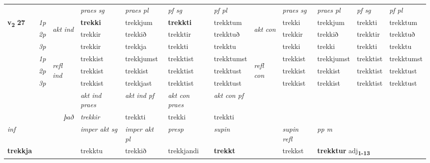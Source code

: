 \begin{longtable}[l]{X>{\footnotesize\itshape}llXXXXlXXXX}
\midrule

 & &   & \textit{praes sg}  & \textit{praes pl}    & \textit{ pf sg} & \textit{pf pl} & & \textit{praes sg}  & \textit{praes pl}    & \textit{pf sg} & \textit{pf pl }  \\ \cmidrule{4-7} \cmidrule{9-12}
 \multirow{2}{*}{{{\textbf{v{\textsubscript{2}}} \Large{\textbf{27}}}}}  & 1p & \multirow{3}{*}{\begin{turn}{90}\textit{akt ind}\end{turn}} & \textbf{trekki} & trekkjum & \textbf{trekkti} & trekktum & \multirow{3}{*}{\begin{turn}{90}\textit{akt con}\end{turn}} &trekki & trekkjum & trekkti & trekktum\\*
 & 2p &  &  trekkir  & trekkið & trekktir & trekktuð & & trekkir & trekkið & trekktir & trekktuð \\*
 & 3p &  & trekkir & trekkja & trekkti & trekktu & & trekki & trekki& trekkti & trekktu \\*
\cmidrule{4-7} \cmidrule{9-12}
 & 1p & \multirow{3}{*}{\begin{turn}{90}\textit{refl ind}\end{turn}}  & trekkist & trekkjumst & trekktist & trekktumst & \multirow{3}{*}{\begin{turn}{90}\textit{refl con}\end{turn}}  &trekkist & trekkjumst & trekktist & trekktumst \\*
 & 2p &  & trekkist & trekkist & trekktist & trekktust & &trekkist & trekkist & trekktist & trekktust \\*
 & 3p  & & trekkist & trekkjast & trekktist & trekktust & & trekkist & trekkist& trekktist & trekktust \\*
\cmidrule{4-7} \cmidrule{9-12}

   && &  \textit{akt ind praes} & \textit{akt ind pf} & \textit{akt con praes} & \textit{akt con pf} \\*
\multicolumn{3}{r}{\textit{það}} & trekkir & trekkti & trekki & trekkti \\*

\cmidrule{4-7}
   {\textit{inf}} & &  & \textit{imper akt sg} & \textit{imper akt pl}   & \textit{presp} & \textit{supin} && \textit{supin refl} & \textit{pp m} \\*
  {\textbf{trekkja}} & && trekktu  & trekkið   & trekkjandi &  \textbf{trekkt} && trekkst & \multicolumn{2}{l}{\textbf{trekktur} adj\textbf{\textsubscript{1-13}}} \\*


\end{longtable}

